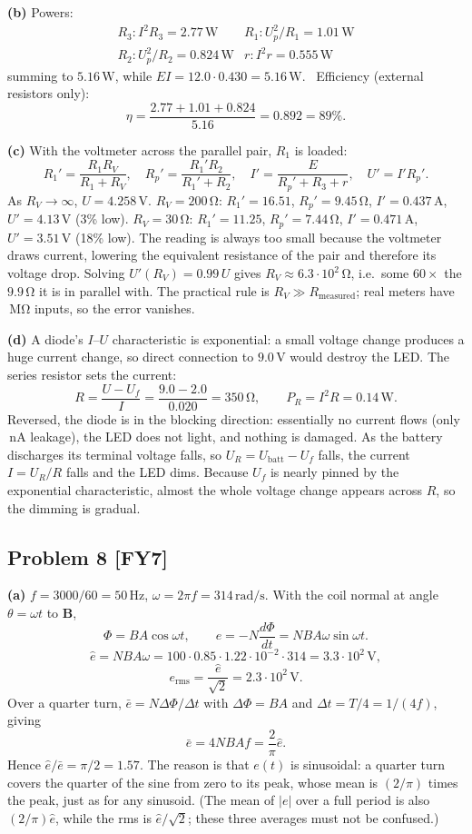 \documentclass[11pt,a4paper]{article}
\newcommand{\problem}[2]{\subsection*{Problem #1 \; \textnormal{\small[#2]}}}
\newcommand{\unit}[1]{\,\mathrm{#1}}
\begin{document}
\textbf{(b)} Powers:
\[
\begin{array}{ll}
R_3: I^2R_3=2.77\unit{W} & R_1:U_p^2/R_1=1.01\unit{W}\\
R_2:U_p^2/R_2=0.824\unit{W} & r: I^2r=0.555\unit{W}
\end{array}
\]
summing to $5.16\unit{W}$, while $EI=12.0\cdot0.430=5.16\unit{W}$.
\checkmark\ Efficiency (external resistors only):
\[
  \eta=\frac{2.77+1.01+0.824}{5.16}=0.892=\boxed{89\%}.
\]

\textbf{(c)} With the voltmeter across the parallel pair, $R_1$ is loaded:
\[
  R_1'=\frac{R_1R_V}{R_1+R_V},\quad
  R_p'=\frac{R_1'R_2}{R_1'+R_2},\quad
  I'=\frac{E}{R_p'+R_3+r},\quad U'=I'R_p' .
\]
As $R_V\to\infty$, $U=4.258\unit{V}$.
$R_V=200\unit{\Omega}$: $R_1'=16.51$, $R_p'=9.45\unit{\Omega}$,
$I'=0.437\unit{A}$, $U'=\boxed{4.13\unit{V}}$ (3\% low).
$R_V=30\unit{\Omega}$: $R_1'=11.25$, $R_p'=7.44\unit{\Omega}$,
$I'=0.471\unit{A}$, $U'=\boxed{3.51\unit{V}}$ (18\% low).
The reading is always too small because the voltmeter draws current,
lowering the equivalent resistance of the pair and therefore its voltage
drop. Solving $U'(R_V)=0.99\,U$ gives
$R_V\approx6.3\cdot10^{2}\unit{\Omega}$, i.e.\ some $60\times$ the
$9.9\unit{\Omega}$ it is in parallel with. The practical rule is
$R_V\gg R_{\text{measured}}$; real meters have $\unit{M\Omega}$ inputs, so
the error vanishes.

\textbf{(d)} A diode's $I$--$U$ characteristic is exponential: a small
voltage change produces a huge current change, so direct connection to
$9.0\unit{V}$ would destroy the LED. The series resistor sets the current:
\[
  R=\frac{U-U_f}{I}=\frac{9.0-2.0}{0.020}=\boxed{350\unit{\Omega}},
  \qquad P_R=I^2R=\boxed{0.14\unit{W}} .
\]
Reversed, the diode is in the blocking direction: essentially no current
flows (only $\unit{nA}$ leakage), the LED does not light, and nothing is
damaged. As the battery discharges its terminal voltage falls, so
$U_R=U_{\text{batt}}-U_f$ falls, the current $I=U_R/R$ falls and the LED
dims. Because $U_f$ is nearly pinned by the exponential characteristic,
almost the whole voltage change appears across $R$, so the dimming is
gradual.

\problem{8}{FY7}
\textbf{(a)} $f=3000/60=50\unit{Hz}$, $\omega=2\pi f=314\unit{rad/s}$.
With the coil normal at angle $\theta=\omega t$ to $\mathbf B$,
\[
  \Phi=BA\cos\omega t,\qquad
  e=-N\frac{d\Phi}{dt}=NBA\omega\sin\omega t .
\]
\[
  \hat e=NBA\omega
  =100\cdot0.85\cdot1.22\cdot10^{-2}\cdot314
  =\boxed{3.3\cdot10^2\unit{V}},
\]
\[
  e_{\text{rms}}=\frac{\hat e}{\sqrt2}=\boxed{2.3\cdot10^2\unit{V}}.
\]
Over a quarter turn, $\bar e=N\Delta\Phi/\Delta t$ with $\Delta\Phi=BA$
and $\Delta t=T/4=1/(4f)$, giving
\[
  \bar e = 4NBAf = \frac{2}{\pi}\hat e .
\]
Hence $\hat e/\bar e=\pi/2=1.57$. The reason is that $e(t)$ is sinusoidal:
a quarter turn covers the quarter of the sine from zero to its peak, whose
mean is $(2/\pi)$ times the peak, just as for any sinusoid. (The mean of
$|e|$ over a full period is also $(2/\pi)\hat e$, while the rms is
$\hat e/\sqrt2$; these three averages must not be confused.)
\end{document}

